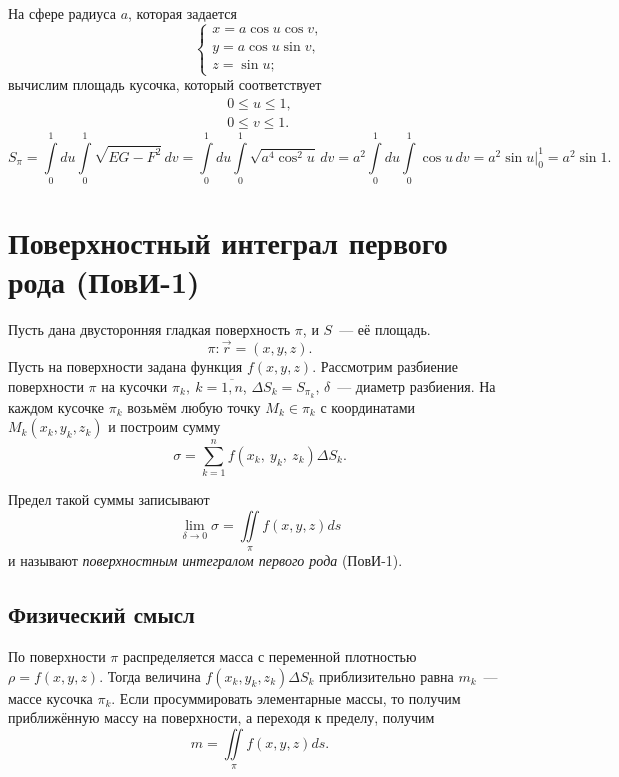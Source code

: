 \documentclass[../../main.tex]{subfiles}
\begin{document}
\begin{exmp}
На сфере радиуса $a$, которая задается
\[
\begin{cases}
 x = a\cos u\cos v, \\
 y = a\cos u\sin v,\\
 z = \sin u;
\end{cases}\]
вычислим площадь кусочка, который соответствует
\begin{gather*}
0 \leq u \leq 1, \\ 0 \leq v \leq 1.
\end{gather*}
\[
 S_\pi = \int\limits_0^1du\int\limits_0^1\sqrt{EG-F^2}\,dv = 
 \int\limits_0^1du\int\limits_0^1\sqrt{a^4\cos^2u}\,dv = 
 a^2\int\limits_0^1du\int\limits_0^1\cos u\,dv = a^2\sin u\big|_0^1 = a^2\sin 
 1.
\]
\end{exmp}

\section{Поверхностный интеграл первого рода (ПовИ-1)}

Пусть дана двусторонняя гладкая поверхность $\pi$, и $S$~--- её площадь. \[\pi 
: 
\vec{r} = (x, y, z).\]
Пусть на поверхности задана функция $f(x, y, z)$. 
Рассмотрим разбиение поверхности $\pi$ на кусочки $\pi_k,\ k = \overline{1, 
n}$, $\Delta 
S_k = S_{\pi_k}$, $\delta$~--- диаметр разбиения. На каждом кусочке $\pi_k$ 
возьмём любую точку $M_k \in \pi_k$ с координатами $M_k(x_k, y_k, z_k)$ и 
построим сумму \[\sigma = \sum\limits_{k = 1}^nf(x_k, \ y_k, \ z_k)\Delta 
S_k.\]

Предел такой суммы записывают
\[\lim\limits_{\delta\rightarrow0}\sigma = \iint\limits_\pi f(x, y, 
z)ds\] и называют \emph{поверхностным интегралом первого рода} (ПовИ-1).

\subsection{Физический смысл}
По поверхности $\pi$ распределяется масса с переменной плотностью $\rho = f(x, 
y, z)$. Тогда величина $f(x_k, y_k, z_k)\Delta S_k$ 
приблизительно равна $m_k$~--- массе кусочка $\pi_k$. Если просуммировать 
элементарные массы, то получим приближённую массу на поверхности, а переходя к 
пределу, получим \[m = \iint\limits_\pi f(x, y, z)ds.\]
\end{document}
